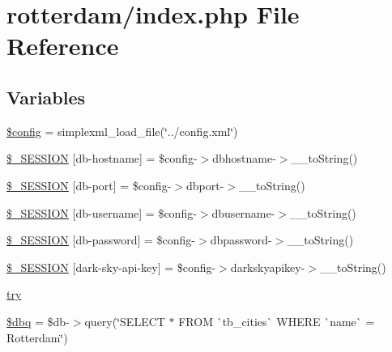 \hypertarget{rotterdam_2index_8php}{}\section{rotterdam/index.php File Reference}
\label{rotterdam_2index_8php}
\subsection*{Variables}
\begin{DoxyCompactItemize}
\item 
\mbox{\hyperlink{rotterdam_2index_8php_a49c7011be9c979d9174c52a8b83e5d8e}{\$config}} = simplexml\+\_\+load\+\_\+file(\char`\"{}../config.\+xml\char`\"{})
\item 
\mbox{\hyperlink{rotterdam_2index_8php_a2204e38201e377d62677f13b1a9fbd97}{\$\+\_\+\+S\+E\+S\+S\+I\+ON}} \mbox{[}\textquotesingle{}db-\/hostname\textquotesingle{}\mbox{]} = \$config-\/$>$dbhostname-\/$>$\+\_\+\+\_\+to\+String()
\item 
\mbox{\hyperlink{rotterdam_2index_8php_a9c0a33c1d865bc2705937df84d037856}{\$\+\_\+\+S\+E\+S\+S\+I\+ON}} \mbox{[}\textquotesingle{}db-\/port\textquotesingle{}\mbox{]} = \$config-\/$>$dbport-\/$>$\+\_\+\+\_\+to\+String()
\item 
\mbox{\hyperlink{rotterdam_2index_8php_a22b01b4f5ad2c75f89289926c55b8eb7}{\$\+\_\+\+S\+E\+S\+S\+I\+ON}} \mbox{[}\textquotesingle{}db-\/username\textquotesingle{}\mbox{]} = \$config-\/$>$dbusername-\/$>$\+\_\+\+\_\+to\+String()
\item 
\mbox{\hyperlink{rotterdam_2index_8php_a0b6acdb2eec8adedd51284ac5a5a9748}{\$\+\_\+\+S\+E\+S\+S\+I\+ON}} \mbox{[}\textquotesingle{}db-\/password\textquotesingle{}\mbox{]} = \$config-\/$>$dbpassword-\/$>$\+\_\+\+\_\+to\+String()
\item 
\mbox{\hyperlink{rotterdam_2index_8php_a6ec14c128bfe7633c023f7e99db766a2}{\$\+\_\+\+S\+E\+S\+S\+I\+ON}} \mbox{[}\textquotesingle{}dark-\/sky-\/api-\/key\textquotesingle{}\mbox{]} = \$config-\/$>$darkskyapikey-\/$>$\+\_\+\+\_\+to\+String()
\item 
\mbox{\hyperlink{rotterdam_2index_8php_abe4cc9788f52e49485473dc699537388}{try}}
\item 
\mbox{\hyperlink{rotterdam_2index_8php_ab76933014035168a37e7e525ca8fbabe}{\$dbq}} = \$db-\/$>$query(\char`\"{}S\+E\+L\+E\+CT $\ast$ F\+R\+OM \`{}tb\+\_\+cities\`{} W\+H\+E\+RE \`{}name\`{} = \textquotesingle{}Rotterdam\textquotesingle{}\char`\"{})
\item 

\end{DoxyCompactItemize}
